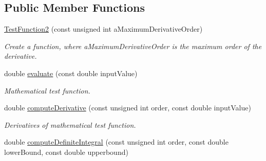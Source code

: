 \subsection*{Public Member Functions}
\begin{DoxyCompactItemize}
\item 
\hyperlink{structtudat_1_1unit__tests_1_1TestFunction2_ad9fc9e7684261a38d8ba414ed5540e76}{Test\+Function2} (const unsigned int a\+Maximum\+Derivative\+Order)\hypertarget{structtudat_1_1unit__tests_1_1TestFunction2_ad9fc9e7684261a38d8ba414ed5540e76}{}\label{structtudat_1_1unit__tests_1_1TestFunction2_ad9fc9e7684261a38d8ba414ed5540e76}

\begin{DoxyCompactList}\small\item\em Create a function, where a\+Maximum\+Derivative\+Order is the maximum order of the derivative. \end{DoxyCompactList}\item 
double \hyperlink{structtudat_1_1unit__tests_1_1TestFunction2_af48f8ec9949c4a3fd79600e945490c9b}{evaluate} (const double input\+Value)\hypertarget{structtudat_1_1unit__tests_1_1TestFunction2_af48f8ec9949c4a3fd79600e945490c9b}{}\label{structtudat_1_1unit__tests_1_1TestFunction2_af48f8ec9949c4a3fd79600e945490c9b}

\begin{DoxyCompactList}\small\item\em Mathematical test function. \end{DoxyCompactList}\item 
double \hyperlink{structtudat_1_1unit__tests_1_1TestFunction2_ad4de6c3724f2c6684ece65b7628c3e24}{compute\+Derivative} (const unsigned int order, const double input\+Value)\hypertarget{structtudat_1_1unit__tests_1_1TestFunction2_ad4de6c3724f2c6684ece65b7628c3e24}{}\label{structtudat_1_1unit__tests_1_1TestFunction2_ad4de6c3724f2c6684ece65b7628c3e24}

\begin{DoxyCompactList}\small\item\em Derivatives of mathematical test function. \end{DoxyCompactList}\item 
double \hyperlink{structtudat_1_1unit__tests_1_1TestFunction2_a48c8418d145c79eec735d44d96cbf893}{compute\+Definite\+Integral} (const unsigned int order, const double lower\+Bound, const double upperbound)\hypertarget{structtudat_1_1unit__tests_1_1TestFunction2_a48c8418d145c79eec735d44d96cbf893}{}\label{structtudat_1_1unit__tests_1_1TestFunction2_a48c8418d145c79eec735d44d96cbf893}


\end{DoxyCompactItemize}
